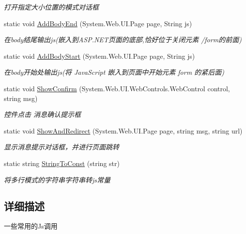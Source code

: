 \begin{DoxyCompactItemize}
\begin{DoxyCompactList}\small\item\em 打开指定大小位置的模式对话框 \end{DoxyCompactList}\item 
static void \hyperlink{class_x_c_l_net_tools_1_1_javascript_1_1_jscript_a3dcdf2894a7187508492083b6743abe1}{Add\-Body\-End} (System.\-Web.\-U\-I.\-Page page, String js)
\begin{DoxyCompactList}\small\item\em 在body结尾输出js(嵌入到\-A\-S\-P.\-N\-E\-T页面的底部,恰好位于关闭元素 /form的前面) \end{DoxyCompactList}\item 
static void \hyperlink{class_x_c_l_net_tools_1_1_javascript_1_1_jscript_ab8e14181b9b1e9f12462ef20f49d69ee}{Add\-Body\-Start} (System.\-Web.\-U\-I.\-Page page, String js)
\begin{DoxyCompactList}\small\item\em 在body开始处输出js(将 Java\-Script 嵌入到页面中开始元素 form 的紧后面) \end{DoxyCompactList}\item 
static void \hyperlink{class_x_c_l_net_tools_1_1_javascript_1_1_jscript_a94e45aa47def3164202b40ff0405f922}{Show\-Confirm} (System.\-Web.\-U\-I.\-Web\-Controls.\-Web\-Control control, string msg)
\begin{DoxyCompactList}\small\item\em 控件点击 消息确认提示框 \end{DoxyCompactList}\item 
static void \hyperlink{class_x_c_l_net_tools_1_1_javascript_1_1_jscript_ade747fd49c7e14dae3652e014a6255d9}{Show\-And\-Redirect} (System.\-Web.\-U\-I.\-Page page, string msg, string url)
\begin{DoxyCompactList}\small\item\em 显示消息提示对话框，并进行页面跳转 \end{DoxyCompactList}\item 
static string \hyperlink{class_x_c_l_net_tools_1_1_javascript_1_1_jscript_a169e7cb3d0960d4757f4b0f831fa0551}{String\-To\-Const} (string str)
\begin{DoxyCompactList}\small\item\em 将多行模式的字符串字符串转js常量 \end{DoxyCompactList}\end{DoxyCompactItemize}


\subsection{详细描述}
一些常用的\-Js调用 



